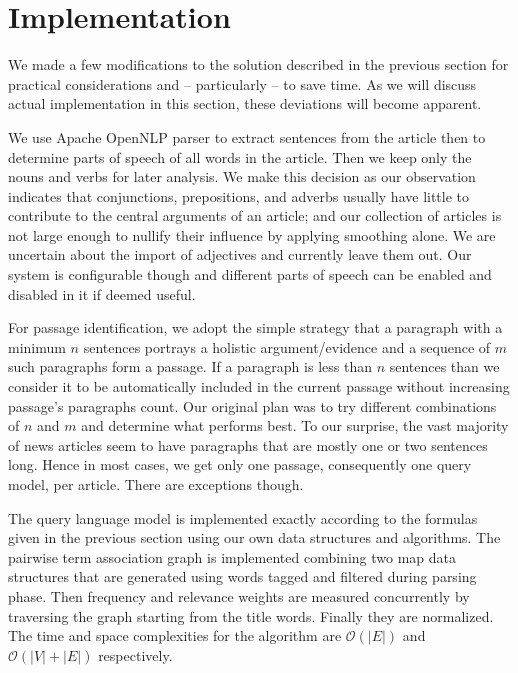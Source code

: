 \documentclass[article]{IEEEtran}
\begin{document}
\section{Implementation}
\label{si}
We made a few modifications to the solution described in the previous section for practical considerations and -- particularly -- to save time. As we will discuss actual implementation in this section, these deviations will become apparent.   

We use Apache OpenNLP parser \cite{openNLP} to extract sentences from the article then to determine parts of speech of all words in the article. Then we keep only the nouns and verbs for later analysis. We make this decision as our observation indicates that conjunctions, prepositions, and adverbs usually have little to contribute to the central arguments of an article; and our collection of articles is not large enough to nullify their influence by applying smoothing alone. We are uncertain about the import of adjectives and currently leave them out. Our system is configurable though and different parts of speech can be enabled and disabled in it if deemed useful.

For passage identification, we adopt the simple strategy that a paragraph with a minimum $n$ sentences portrays a holistic argument/evidence and a sequence of $m$ such paragraphs form a passage. If a paragraph is less than $n$ sentences than we consider it to be automatically included in the current passage without increasing passage's paragraphs count. Our original plan was to try different combinations of $n$ and $m$ and determine what performs best. To our surprise, the vast majority of news articles seem to have paragraphs that are mostly one or two sentences long. Hence in most cases, we get only one passage, consequently one query model, per article. There are exceptions though.                     

The query language model is implemented exactly according to the formulas given in the previous section using our own data structures and algorithms. The pairwise term association graph is implemented combining two map data structures that are generated using words tagged and filtered during parsing phase. Then frequency and relevance weights are measured concurrently by traversing the graph starting from the title words. Finally they are normalized. The time and space complexities for the algorithm are $\mathcal{O}(|E|)$ and $\mathcal{O}(|V| + |E|)$ respectively.
\end{document}
